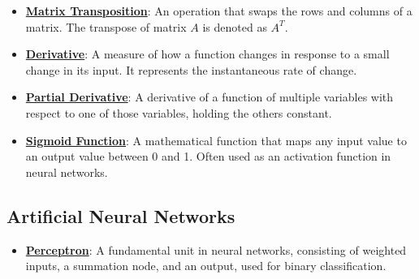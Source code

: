 \documentclass{article}%
\begin{document}
\begin{itemize}[leftmargin=*]
\item \href{https://purdue.brightspace.com/d2l/common/assets/pdfjs-d2l-dist/1.0.14-legacy/web/viewer.html?file=%2Fcontent%2Fenforced%2F1095467-wl.202510.CS.24300.001%2F04L1-Linear Algebra Primer.pdf%3Fou%3D1095467&lang=en-us&container=d2l-fileviewer-rendered-pdf&fullscreen=d2l-fileviewer-rendered-pdf-dialog&height=667#page=16}{\textbf{Matrix Transposition}}: An operation that swaps the rows and columns of a matrix. The transpose of matrix $A$ is denoted as $A^T$.%
\item \href{https://purdue.brightspace.com/d2l/common/assets/pdfjs-d2l-dist/1.0.14-legacy/web/viewer.html?file=%2Fcontent%2Fenforced%2F1095467-wl.202510.CS.24300.001%2F04L1-Linear Algebra Primer.pdf%3Fou%3D1095467&lang=en-us&container=d2l-fileviewer-rendered-pdf&fullscreen=d2l-fileviewer-rendered-pdf-dialog&height=667#page=21}{\textbf{Derivative}}: A measure of how a function changes in response to a small change in its input. It represents the instantaneous rate of change.%
\item \href{https://purdue.brightspace.com/d2l/common/assets/pdfjs-d2l-dist/1.0.14-legacy/web/viewer.html?file=%2Fcontent%2Fenforced%2F1095467-wl.202510.CS.24300.001%2F04L1-Linear Algebra Primer.pdf%3Fou%3D1095467&lang=en-us&container=d2l-fileviewer-rendered-pdf&fullscreen=d2l-fileviewer-rendered-pdf-dialog&height=667#page=19}{\textbf{Partial Derivative}}: A derivative of a function of multiple variables with respect to one of those variables, holding the others constant.%
\item \href{https://purdue.brightspace.com/d2l/common/assets/pdfjs-d2l-dist/1.0.14-legacy/web/viewer.html?file=%2Fcontent%2Fenforced%2F1095467-wl.202510.CS.24300.001%2F04L1-Linear Algebra Primer.pdf%3Fou%3D1095467&lang=en-us&container=d2l-fileviewer-rendered-pdf&fullscreen=d2l-fileviewer-rendered-pdf-dialog&height=667#page=21}{\textbf{Sigmoid Function}}: A mathematical function that maps any input value to an output value between 0 and 1. Often used as an activation function in neural networks.%
\end{itemize}

%
\subsection{Artificial Neural Networks}%
\label{subsec:ArtificialNeuralNetworks}%
\begin{itemize}[leftmargin=*]%
\item \href{https://purdue.brightspace.com/d2l/common/assets/pdfjs-d2l-dist/1.0.14-legacy/web/viewer.html?file=%2Fcontent%2Fenforced%2F1095467-wl.202510.CS.24300.001%2F02L2-Intro.pdf%3Fou%3D1095467&lang=en-us&container=d2l-fileviewer-rendered-pdf&fullscreen=d2l-fileviewer-rendered-pdf-dialog&height=667#page=45}{\textbf{Perceptron}}: A fundamental unit in neural networks, consisting of weighted inputs, a summation node, and an output, used for binary classification.%
\end{itemize}
\end{document}
